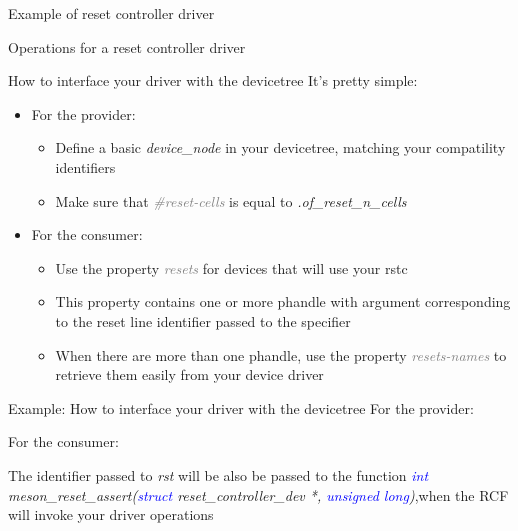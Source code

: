 \documentclass{beamer}
\begin{document}
\begin{frame}{Example of reset controller driver}
	
\end{frame}

\begin{frame}{Operations for a reset controller driver}
	
\end{frame}

\begin{frame}{How to interface your driver with the devicetree}
	It's pretty simple:
	\begin{itemize}
		\item For the provider:
		\begin{itemize}
			\item Define a basic \textit{device\_node} in your devicetree, matching your compatility identifiers
			\item Make sure that \textit{\textcolor{gray}{\#reset-cells}} is equal to \textit{.of\_reset\_n\_cells}
		\end{itemize}
		\item For the consumer:
		\begin{itemize}
			\item Use the property \textit{\textcolor{gray}{resets}} for devices that will use your rstc
			\item This property contains one or more phandle with argument corresponding to the reset line identifier passed to the specifier
			\item When there are more than one phandle, use the property \textit{\textcolor{gray}{resets-names}} to retrieve them easily from your device driver
		\end{itemize}
	\end{itemize}
\end{frame}

\begin{frame}{Example: How to interface your driver with the devicetree}
	For the provider:
	
	For the consumer:
	
	The identifier passed to \textit{rst} will be also be passed to the function \newline\textit{\textcolor{blue}{int} meson\_reset\_assert(\textcolor{blue}{struct} reset\_controller\_dev *, \textcolor{blue}{unsigned long})},\newline when the RCF will invoke your driver operations
\end{frame}
\end{document}
